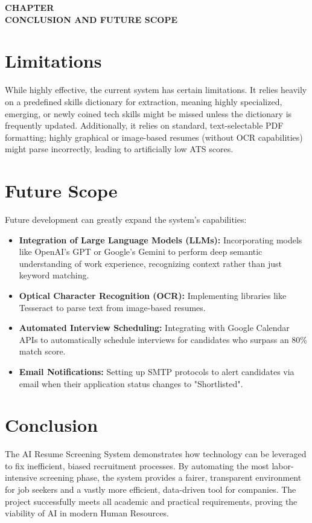 \documentclass[12pt,a4paper]{report}
\newcommand{\chaptertitlepage}[1]{%
\cleardoublepage
\thispagestyle{empty}
\null
\vfill
\begin{center}
{\fontsize{16pt}{18pt}\selectfont\bfseries
CHAPTER \thechapter}\\[0.5cm]
{\fontsize{16pt}{18pt}\selectfont\bfseries
#1}
\end{center}
\vfill
\null
\clearpage
}
\begin{document}
\chaptertitlepage{CONCLUSION AND FUTURE SCOPE}
\section{Limitations}
While highly effective, the current system has certain limitations. It relies heavily on a predefined skills dictionary for extraction, meaning highly specialized, emerging, or newly coined tech skills might be missed unless the dictionary is frequently updated. Additionally, it relies on standard, text-selectable PDF formatting; highly graphical or image-based resumes (without OCR capabilities) might parse incorrectly, leading to artificially low ATS scores.

\section{Future Scope}
Future development can greatly expand the system's capabilities:
\begin{itemize}
\item \textbf{Integration of Large Language Models (LLMs):} Incorporating models like OpenAI's GPT or Google's Gemini to perform deep semantic understanding of work experience, recognizing context rather than just keyword matching.
\item \textbf{Optical Character Recognition (OCR):} Implementing libraries like Tesseract to parse text from image-based resumes.
\item \textbf{Automated Interview Scheduling:} Integrating with Google Calendar APIs to automatically schedule interviews for candidates who surpass an 80\% match score.
\item \textbf{Email Notifications:} Setting up SMTP protocols to alert candidates via email when their application status changes to "Shortlisted".
\end{itemize}

\section{Conclusion}
The AI Resume Screening System demonstrates how technology can be leveraged to fix inefficient, biased recruitment processes. By automating the most labor-intensive screening phase, the system provides a fairer, transparent environment for job seekers and a vastly more efficient, data-driven tool for companies. The project successfully meets all academic and practical requirements, proving the viability of AI in modern Human Resources.
\end{document}
